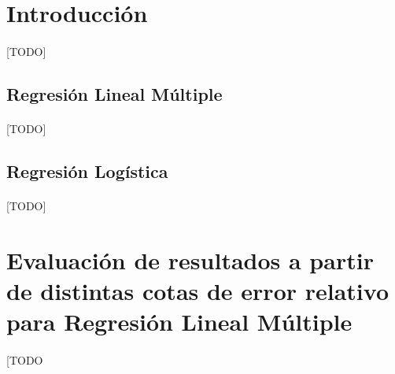 \documentclass{article}
\begin{document}
	\maketitle %

	\thispagestyle{fancy} %



	\begin{abstract}
		\noindent [TODO ]
	\end{abstract}



	\section{Introducción}
	\label{sec:introducción}

		\paragraph{}
		[TODO]

		\subsection{Regresión Lineal Múltiple}

			\paragraph{}
			[TODO]



		\subsection{Regresión Logística}

			\paragraph{}
			[TODO]




	\section{Evaluación de resultados a partir de distintas cotas de error relativo para Regresión Lineal Múltiple}
	\label{sec:e1}

		\paragraph{}
		[TODO
\end{document}
